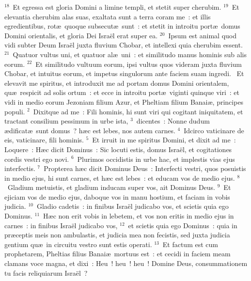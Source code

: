 ${}^{18}$~Et egressa est gloria Domini a limine templi, et stetit super cherubim.
${}^{19}$~Et elevantia cherubim alas suas, exaltata sunt a terra coram me~: et illis egredientibus, rot\ae\ quoque subsecut\ae\ sunt~: et stetit in introitu port\ae\ domus Domini orientalis, et gloria Dei Isra\"el erat super ea.
${}^{20}$~Ipsum est animal quod vidi subter Deum Isra\"el juxta fluvium Chobar, et intellexi quia cherubim essent.
${}^{21}$~Quatuor vultus uni, et quatuor al\ae\ uni~: et similitudo manus hominis sub alis eorum.
${}^{22}$~Et similitudo vultuum eorum, ipsi vultus quos videram juxta fluvium Chobar, et intuitus eorum, et impetus singulorum ante faciem suam ingredi.
~Et elevavit me spiritus, et introduxit me ad portam domus Domini orientalem, qu\ae\ respicit ad solis ortum~: et ecce in introitu port\ae\ viginti quinque viri~: et vidi in medio eorum Jezoniam filium Azur, et Pheltiam filium Banai\ae , principes populi.
${}^{2}$~Dixitque ad me~: Fili hominis, hi sunt viri qui cogitant iniquitatem, et tractant consilium pessimum in urbe ista,
${}^{3}$~dicentes~: Nonne dudum \ae dificat\ae\ sunt domus~? h\ae c est lebes, nos autem carnes.
${}^{4}$~Idcirco vaticinare de eis, vaticinare, fili hominis.
${}^{5}$~Et irruit in me spiritus Domini, et dixit ad me~: Loquere~: H\ae c dicit Dominus~: Sic locuti estis, domus Isra\"el, et cogitationes cordis vestri ego novi.
${}^{6}$~Plurimos occidistis in urbe hac, et implestis vias ejus interfectis.
${}^{7}$~Propterea h\ae c dicit Dominus Deus~: Interfecti vestri, quos posuistis in medio ejus, hi sunt carnes, et h\ae c est lebes~: et educam vos de medio ejus.
${}^{8}$~Gladium metuistis, et gladium inducam super vos, ait Dominus Deus.
${}^{9}$~Et ejiciam vos de medio ejus, daboque vos in manu hostium, et faciam in vobis judicia.
${}^{10}$~Gladio cadetis~: in finibus Isra\"el judicabo vos, et scietis quia ego Dominus.
${}^{11}$~H\ae c non erit vobis in lebetem, et vos non eritis in medio ejus in carnes~: in finibus Isra\"el judicabo vos,
${}^{12}$~et scietis quia ego Dominus~: quia in pr\ae ceptis meis non ambulastis, et judicia mea non fecistis, sed juxta judicia gentium qu\ae\ in circuitu vestro sunt estis operati.
${}^{13}$~Et factum est cum prophetarem, Pheltias filius Banai\ae\ mortuus est~: et cecidi in faciem meam clamans voce magna, et dixi~: Heu~! heu~! heu~! Domine Deus, consummationem tu facis reliquiarum Isra\"el~?


